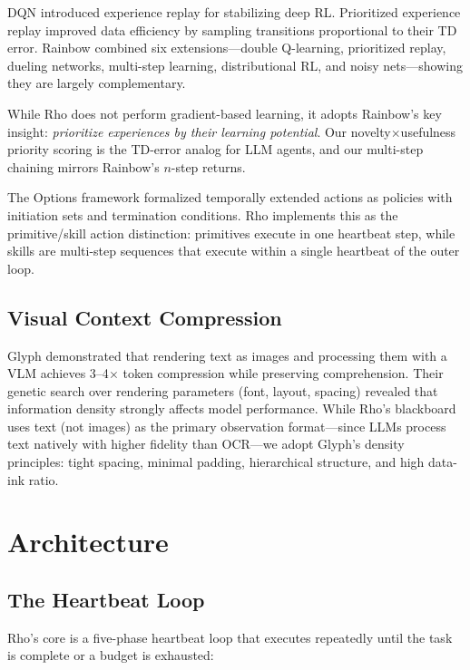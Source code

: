 \documentclass[letterpaper]{article}
\begin{document}
DQN \citep{mnih2015human} introduced experience replay for stabilizing deep RL. Prioritized experience replay \citep{schaul2016prioritized} improved data efficiency by sampling transitions proportional to their TD error. Rainbow \citep{hessel2018rainbow} combined six extensions---double Q-learning, prioritized replay, dueling networks, multi-step learning, distributional RL, and noisy nets---showing they are largely complementary.

While Rho does not perform gradient-based learning, it adopts Rainbow's key insight: \emph{prioritize experiences by their learning potential}. Our novelty$\times$usefulness priority scoring is the TD-error analog for LLM agents, and our multi-step chaining mirrors Rainbow's $n$-step returns.

The Options framework \citep{sutton1999between} formalized temporally extended actions as policies with initiation sets and termination conditions. Rho implements this as the primitive/skill action distinction: primitives execute in one heartbeat step, while skills are multi-step sequences that execute within a single heartbeat of the outer loop.

\subsection{Visual Context Compression}

Glyph \citep{cheng2025glyph} demonstrated that rendering text as images and processing them with a VLM achieves 3--4$\times$ token compression while preserving comprehension. Their genetic search over rendering parameters (font, layout, spacing) revealed that information density strongly affects model performance. While Rho's blackboard uses text (not images) as the primary observation format---since LLMs process text natively with higher fidelity than OCR---we adopt Glyph's density principles: tight spacing, minimal padding, hierarchical structure, and high data-ink ratio.


\section{Architecture}

\subsection{The Heartbeat Loop}

Rho's core is a five-phase heartbeat loop that executes repeatedly until the task is complete or a budget is exhausted:
\end{document}
